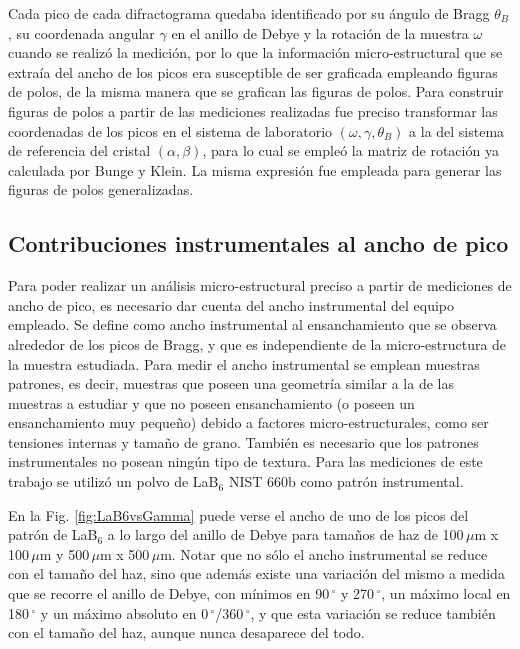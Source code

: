 Cada pico de cada difractograma quedaba identificado por su ángulo de Bragg $\theta_B$, su coordenada angular $\gamma$ en el anillo de Debye y la rotación de la muestra $\omega$ cuando se realizó la medición, por lo que la información micro-estructural que se extraía del ancho de los picos era susceptible de ser graficada empleando figuras de polos, de la misma manera que se grafican las figuras de polos.
Para construir figuras de polos a partir de las mediciones realizadas fue preciso transformar las coordenadas de los picos en el sistema de laboratorio $(\omega, \gamma, \theta_B)$ a la del sistema de referencia del cristal $(\alpha, \beta)$, para lo cual se empleó la matriz de rotación ya calculada por Bunge y Klein\cite{Bunge1996}.
La misma expresión fue empleada para generar las figuras de polos generalizadas.

\subsection{Contribuciones instrumentales al ancho de pico}\label{SS:inst}
Para poder realizar un análisis micro-estructural preciso a partir de mediciones de ancho de pico, es necesario dar cuenta del ancho instrumental del equipo empleado.
Se define como ancho instrumental al ensanchamiento que se observa alrededor de los picos de Bragg, y que es independiente de la micro-estructura de la muestra estudiada.
Para medir el ancho instrumental se emplean muestras patrones, es decir, muestras que poseen una geometría similar a la de las muestras a estudiar y que no poseen ensanchamiento (o poseen un ensanchamiento muy pequeño) debido a factores micro-estructurales, como ser tensiones internas y tamaño de grano.
También es necesario que los patrones instrumentales no posean ningún tipo de textura.
Para las mediciones de este trabajo se utilizó un polvo de LaB$_6$ NIST 660b como patrón instrumental.

En la Fig. \ref{fig:LaB6vsGamma} puede verse el ancho de uno de los picos del patrón de LaB$_6$ a lo largo del anillo de Debye para tamaños de haz de 100\,$\mu$m x 100\,$\mu$m y 500\,$\mu$m x 500\,$\mu$m.
Notar que no sólo el ancho instrumental se reduce con el tamaño del haz, sino que además existe una variación del mismo a medida que se recorre el anillo de Debye, con mínimos en 90\,$^{\circ}$ y 270\,$^{\circ}$, un máximo local en 180\,$^{\circ}$ y un máximo absoluto en 0\,$^{\circ}$/360\,$^{\circ}$, y que esta variación se reduce también con el tamaño del haz, aunque nunca desaparece del todo.

